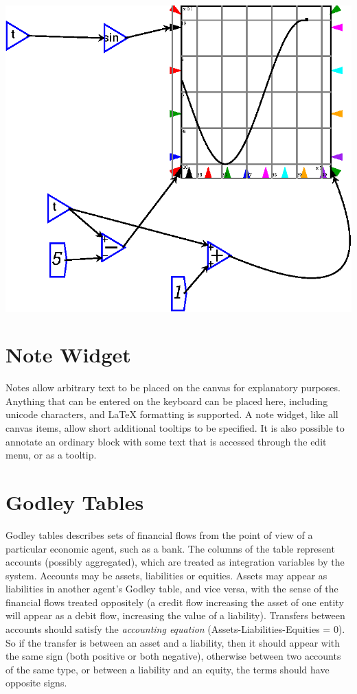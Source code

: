 \begin{description}
\begin{center}
\includegraphics{images/plotSlidingWindow.eps}
\end{center}
\end{description}

\section{Note Widget}
 \label{Notes}\label{Item} Notes allow arbitrary text to be
placed on the canvas for explanatory purposes. Anything that can be
entered on the keyboard can be placed here, including unicode
characters, and LaTeX formatting is supported. A note
widget, like all canvas items, allow short additional tooltips to be
specified. It is also possible to annotate an ordinary block with some text
that is accessed through the edit menu, or as a tooltip.

\section{Godley Tables}\label{godley}\label{GodleyIcon}

Godley tables describes sets of financial flows from the point of view
of a particular economic agent, such as a bank. The columns of the
table represent accounts (possibly aggregated), which are treated as
integration variables by the system. Accounts may be assets,
liabilities or equities. Assets may appear as liabilities in another
agent's Godley table, and vice versa, with the sense of the financial
flows treated oppositely (a credit flow increasing the asset of one
entity will appear as a debit flow, increasing the value of a
liability). Transfers between accounts should satisfy the {\em
  accounting equation}
(Assets-Liabilities-Equities = 0). So if the transfer is between an
asset and a liability, then it should appear with the same sign (both
positive or both negative), otherwise between two accounts of the same
type, or between a liability and an equity, the terms should have
opposite signs.

